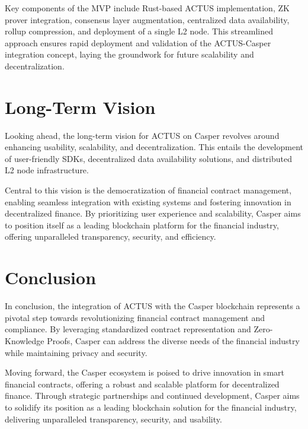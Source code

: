\documentclass[12pt]{article}
\begin{document}
Key components of the MVP include Rust-based ACTUS implementation, ZK prover
integration, consensus layer augmentation, centralized data availability, rollup
compression, and deployment of a single L2 node. This streamlined approach
ensures rapid deployment and validation of the ACTUS-Casper integration concept,
laying the groundwork for future scalability and decentralization.

\section{Long-Term Vision}

Looking ahead, the long-term vision for ACTUS on Casper revolves around
enhancing usability, scalability, and decentralization. This entails the
development of user-friendly SDKs, decentralized data availability solutions,
and distributed L2 node infrastructure.

Central to this vision is the democratization of financial contract management,
enabling seamless integration with existing systems and fostering innovation in
decentralized finance. By prioritizing user experience and scalability, Casper
aims to position itself as a leading blockchain platform for the financial
industry, offering unparalleled transparency, security, and efficiency.

\section{Conclusion}

In conclusion, the integration of ACTUS with the Casper blockchain represents a
pivotal step towards revolutionizing financial contract management and
compliance. By leveraging standardized contract representation and
Zero-Knowledge Proofs, Casper can address the diverse needs of the financial
industry while maintaining privacy and security.

Moving forward, the Casper ecosystem is poised to drive innovation in smart
financial contracts, offering a robust and scalable platform for decentralized
finance. Through strategic partnerships and continued development, Casper aims
to solidify its position as a leading blockchain solution for the financial
industry, delivering unparalleled transparency, security, and usability.
\end{document}
